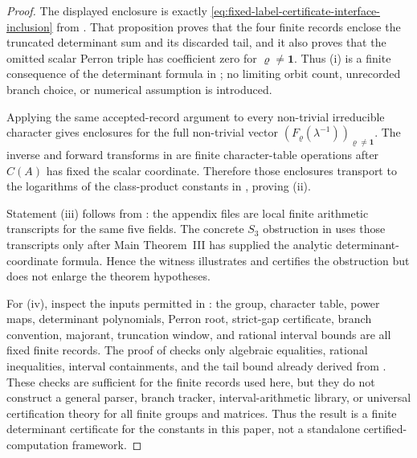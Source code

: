 \documentclass[11pt,a4paper]{amsart}
\theoremstyle{plain}
\theoremstyle{definition}
\theoremstyle{remark}
\begin{document}
\begin{proof}
  The displayed enclosure is exactly
  \eqref{eq:fixed-label-certificate-interface-inclusion} from
  .  That proposition proves that
  the four
  finite records enclose the truncated determinant sum and its discarded tail,
  and it also proves that the omitted scalar Perron triple has coefficient
  zero for \(\varrho\ne\mathbf1\).  Thus (i) is a finite consequence of the
  determinant formula in ; no
  limiting orbit count, unrecorded branch choice, or numerical assumption is
  introduced.

  Applying the same accepted-record argument to every non-trivial irreducible
  character gives enclosures for the full non-trivial vector
  \((F_\varrho(\lambda^{-1}))_{\varrho\ne\mathbf1}\).  The inverse and forward
  transforms in  are finite
  character-table operations after \(C(A)\) has fixed the scalar coordinate.
  Therefore those enclosures transport to the logarithms of the class-product
  constants in , proving (ii).

  Statement (iii) follows from
  : the appendix files are
  local finite arithmetic transcripts for the same five fields.  The
  concrete \(S_3\) obstruction in
  uses those transcripts only after Main Theorem~III has supplied the analytic
  determinant-coordinate formula.  Hence the witness illustrates and certifies
  the obstruction but does not enlarge the theorem hypotheses.

  For (iv), inspect the inputs permitted in
  : the group, character table,
  power maps, determinant polynomials, Perron root, strict-gap certificate,
  branch convention, majorant, truncation window, and rational interval bounds
  are all fixed finite records.  The proof of
   checks only algebraic equalities,
  rational inequalities, interval containments, and the tail bound already
  derived from .  These checks are
  sufficient for the finite records used here, but they do not construct a
  general parser, branch tracker, interval-arithmetic library, or universal
  certification theory for all finite groups and matrices.  Thus the result is
  a finite determinant certificate for the constants in this paper, not a
  standalone certified-computation framework.
\end{proof}
\end{document}

